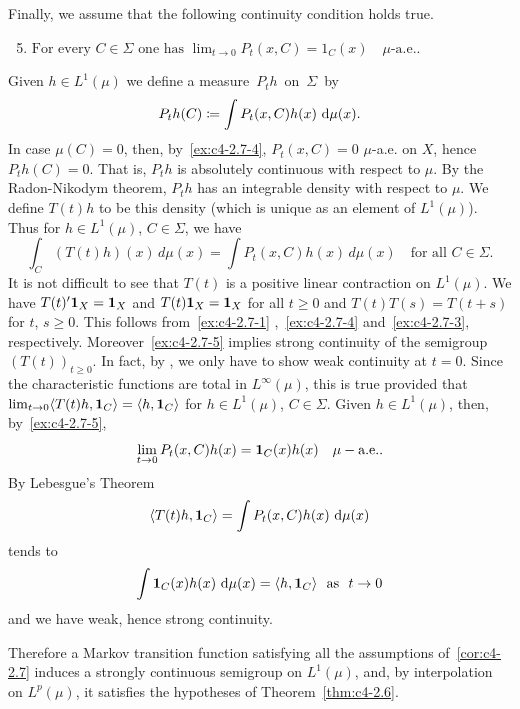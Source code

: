 \begin{example}
Finally, we assume that the following continuity condition holds true.
\begin{enumerate}[\upshape (i)]
\setcounter{enumi}{4}
\item \label{ex:c4-2.7-5}
$\text{For every } C \in \Sigma \text{ one has } \lim_{t \to 0} P_{t}(x,C) = 1_{C}(x) \quad \mu\text{-a.e.}.$
\end{enumerate}
Given $h \in L^{1}(\mu)$ we define a measure\, $P_{t}h$\, on\, $\Sigma$\, by
\[
P_{t}h(C) \coloneqq \int P_{t}(x,C)h(x) \, \mathop{}\!\mathrm{d}{\mu(x)} .
\]
In case $\mu(C) = 0$, then, by~\ref{ex:c4-2.7-4}, $P_{t}(x,C) = 0$ $\mu$-a.e. on $X$, hence $P_{t}h(C) = 0$.
That is, $P_{t}h$ is absolutely continuous with respect to $\mu$.
By the Radon-Nikodym theorem, $P_{t}h$ has an integrable density with respect to $\mu$.
We define $T(t)h$ to be this density (which is unique as an element of\/ $L^{1}(\mu)$).
Thus for $h \in L^{1}(\mu)$, $C \in \Sigma$, we have
\begin{equation}\label{eq:c4-2.8}
\int_{C}(T(t)h)(x) \, d\mu(x) = \int P_{t}(x,C)h(x) \, d\mu(x) \quad \text{for all } C \in \Sigma.
\end{equation}
It is not difficult to see that $T(t)$ is a positive linear contraction on $L^{1}(\mu)$.
We have $T(t)'\mathbf{1}_{X} = \mathbf{1}_{X}$ and $T(t)\mathbf{1}_{X} = \mathbf{1}_{X}$ for all $t \geq 0$ and $T(t)T(s) = T(t+s)$ for $t$, $s \geq 0$.
This follows from~\ref{ex:c4-2.7-1} ,~\ref{ex:c4-2.7-4} and~\ref{ex:c4-2.7-3}, respectively.
Moreover~\ref{ex:c4-2.7-5} implies strong continuity of the semigroup $(T(t))_{t \geq 0}$.
In fact, by \textcite[Proposition 1.23]{davies:1980}, we only have to show weak continuity at $t = 0$.
Since the characteristic functions are total in $L^{\infty}(\mu)$, this is true provided that $\lim_{t \to 0} \langle T(t)h,\mathbf{1}_{C}\rangle = \langle h,\mathbf{1}_{C}\rangle$ for $h \in L^{1}(\mu)$, $C \in \Sigma$.
Given $h \in L^{1}(\mu)$, then, by~\ref{ex:c4-2.7-5}, 
\[
\lim_{t \to 0} P_{t}(x,C)h(x) = \mathbf{1}_{C}(x)h(x)\quad\mu-\text{a.e.}.
\]
By Lebesgue's Theorem 
\[
\langle T(t)h,\mathbf{1}_{C}\rangle = \int P_{t}(x,C)h(x) \, \mathop{}\!\mathrm{d}{\mu(x)}
\]
tends to 
\[
\int \1_{C}(x)h(x) \, \diff{\mu(x)} = \langle h,\1_{C}\rangle \ \text{ as } \ t \to 0
\]
and we have weak, hence strong continuity.

Therefore a Markov transition function satisfying all the assumptions of~\ref{cor:c4-2.7} induces a strongly continuous semigroup on $L^{1}(\mu)$, and, by interpolation on $L^{p}(\mu)$, it satisfies the hypotheses of Theorem~\ref{thm:c4-2.6}.
\end{example}
